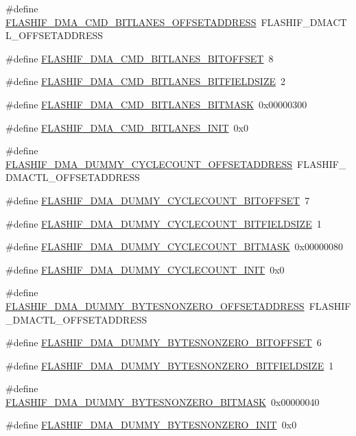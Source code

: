 \begin{DoxyCompactItemize}
\item 
\#define \hyperlink{a00552_a40980d54526d0b569eb754d8066ed9f6}{FLASHIF\_\-DMA\_\-CMD\_\-BITLANES\_\-OFFSETADDRESS}~FLASHIF\_\-DMACTL\_\-OFFSETADDRESS
\item 
\#define \hyperlink{a00552_a7df87d0dc23714531f683d9a2fd98b3b}{FLASHIF\_\-DMA\_\-CMD\_\-BITLANES\_\-BITOFFSET}~8
\item 
\#define \hyperlink{a00552_a5279798f1eec87f1b7c10db720ad1485}{FLASHIF\_\-DMA\_\-CMD\_\-BITLANES\_\-BITFIELDSIZE}~2
\item 
\#define \hyperlink{a00552_a326266b8f76056ec0b4b994aa999d29b}{FLASHIF\_\-DMA\_\-CMD\_\-BITLANES\_\-BITMASK}~0x00000300
\item 
\#define \hyperlink{a00552_acc881560a4f47077b0fe362faea31246}{FLASHIF\_\-DMA\_\-CMD\_\-BITLANES\_\-INIT}~0x0
\item 
\#define \hyperlink{a00552_af0e52ee46cfdad0f40fbe4cfacb9866c}{FLASHIF\_\-DMA\_\-DUMMY\_\-CYCLECOUNT\_\-OFFSETADDRESS}~FLASHIF\_\-DMACTL\_\-OFFSETADDRESS
\item 
\#define \hyperlink{a00552_a52ac73548e4bace3be6658b5e9862c03}{FLASHIF\_\-DMA\_\-DUMMY\_\-CYCLECOUNT\_\-BITOFFSET}~7
\item 
\#define \hyperlink{a00552_aaeff5eb87edd781c5502f771f9903cf1}{FLASHIF\_\-DMA\_\-DUMMY\_\-CYCLECOUNT\_\-BITFIELDSIZE}~1
\item 
\#define \hyperlink{a00552_a6c7e486c7b7054103233387432c86cd9}{FLASHIF\_\-DMA\_\-DUMMY\_\-CYCLECOUNT\_\-BITMASK}~0x00000080
\item 
\#define \hyperlink{a00552_afcf485ec10dc19fade52b06592232e73}{FLASHIF\_\-DMA\_\-DUMMY\_\-CYCLECOUNT\_\-INIT}~0x0
\item 
\#define \hyperlink{a00552_ace1bbce3b18e0ade7d35f49838cc4dc2}{FLASHIF\_\-DMA\_\-DUMMY\_\-BYTESNONZERO\_\-OFFSETADDRESS}~FLASHIF\_\-DMACTL\_\-OFFSETADDRESS
\item 
\#define \hyperlink{a00552_a04f0a2c9223d9f2e42791ba8385442f4}{FLASHIF\_\-DMA\_\-DUMMY\_\-BYTESNONZERO\_\-BITOFFSET}~6
\item 
\#define \hyperlink{a00552_aefd2fadd91e303abd213684d038d1870}{FLASHIF\_\-DMA\_\-DUMMY\_\-BYTESNONZERO\_\-BITFIELDSIZE}~1
\item 
\#define \hyperlink{a00552_af484f72a5ff5a7c362cadefdd4d9d992}{FLASHIF\_\-DMA\_\-DUMMY\_\-BYTESNONZERO\_\-BITMASK}~0x00000040
\item 
\#define \hyperlink{a00552_a80ce2a79b9135bfdcb5e1d59d096cbc7}{FLASHIF\_\-DMA\_\-DUMMY\_\-BYTESNONZERO\_\-INIT}~0x0
\item 

\end{DoxyCompactItemize}
